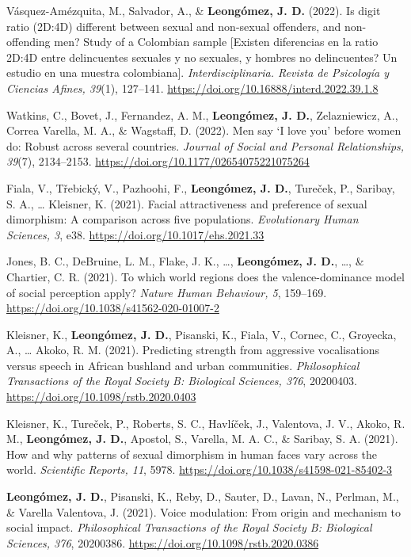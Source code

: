 \documentclass[11pt,a4paper,]{awesome-cv}
\begin{document}
Vásquez-Amézquita, M., Salvador, A., \& \textbf{Leongómez, J. D.}
(2022). Is digit ratio (2D:4D) different between sexual and non-sexual
offenders, and non-offending men? Study of a Colombian sample {[}Existen
diferencias en la ratio 2D:4D entre delincuentes sexuales y no sexuales,
y hombres no delincuentes? Un estudio en una muestra colombiana{]}.
\emph{Interdisciplinaria. Revista de Psicología y Ciencias Afines,
39}(1), 127--141. \url{https://doi.org/10.16888/interd.2022.39.1.8}

Watkins, C., Bovet, J., Fernandez, A. M., \textbf{Leongómez, J. D.},
Zelazniewicz, A., Correa Varella, M. A., \& Wagstaff, D. (2022). Men say
`I love you' before women do: Robust across several countries.
\emph{Journal of Social and Personal Relationships, 39}(7), 2134--2153.
\url{https://doi.org/10.1177/02654075221075264}

Fiala, V., Třebický, V., Pazhoohi, F., \textbf{Leongómez, J. D.},
Tureček, P., Saribay, S. A., \ldots{} Kleisner, K. (2021). Facial
attractiveness and preference of sexual dimorphism: A comparison across
five populations. \emph{Evolutionary Human Sciences, 3}, e38.
\url{https://doi.org/10.1017/ehs.2021.33}

Jones, B. C., DeBruine, L. M., Flake, J. K., \ldots,
\textbf{Leongómez, J. D.}, \ldots, \& Chartier, C. R. (2021). To which
world regions does the valence-dominance model of social perception
apply? \emph{Nature Human Behaviour, 5}, 159--169.
\url{https://doi.org/10.1038/s41562-020-01007-2}

Kleisner, K., \textbf{Leongómez, J. D.}, Pisanski, K., Fiala, V.,
Cornec, C., Groyecka, A., \ldots{} Akoko, R. M. (2021). Predicting
strength from aggressive vocalisations versus speech in African bushland
and urban communities. \emph{Philosophical Transactions of the Royal
Society B: Biological Sciences, 376}, 20200403.
\url{https://doi.org/10.1098/rstb.2020.0403}

Kleisner, K., Tureček, P., Roberts, S. C., Havlíček, J., Valentova, J.
V., Akoko, R. M., \textbf{Leongómez, J. D.}, Apostol, S., Varella, M. A.
C., \& Saribay, S. A. (2021). How and why patterns of sexual dimorphism
in human faces vary across the world. \emph{Scientific Reports, 11},
5978. \url{https://doi.org/10.1038/s41598-021-85402-3}

\textbf{Leongómez, J. D.}, Pisanski, K., Reby, D., Sauter, D., Lavan,
N., Perlman, M., \& Varella Valentova, J. (2021). Voice modulation: From
origin and mechanism to social impact. \emph{Philosophical Transactions
of the Royal Society B: Biological Sciences, 376}, 20200386.
\url{https://doi.org/10.1098/rstb.2020.0386}
\end{document}
